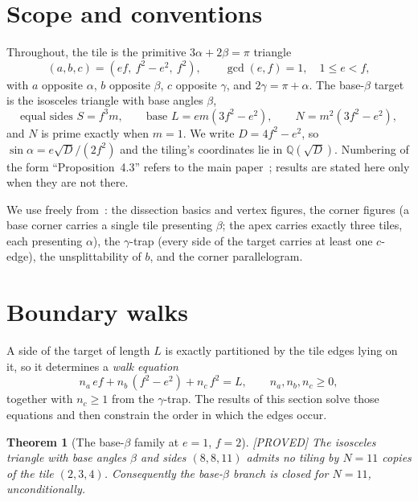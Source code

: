 \documentclass[11pt,reqno]{amsart}
\theoremstyle{plain}
\newtheorem{theorem}{Theorem}
\theoremstyle{definition}
\newcommand{\Q}{\mathbb{Q}}
\newcommand{\lab}[1]{\hfill\textnormal{\footnotesize\textsc{[#1]}}}
\begin{document}
\maketitle

\section{Scope and conventions}\label{sec:compscope}

Throughout, the tile is the primitive $3\alpha+2\beta=\pi$ triangle
\[
(a,b,c)=(ef,\ f^2-e^2,\ f^2),\qquad \gcd(e,f)=1,\quad 1\le e<f,
\]
with $a$ opposite $\alpha$, $b$ opposite $\beta$, $c$ opposite $\gamma$, and $2\gamma=\pi+\alpha$.
The base-$\beta$ target is the isosceles triangle with base angles $\beta$,
\[
\text{equal sides } S=f^3m,\qquad \text{base } L=em(3f^2-e^2),\qquad N=m^2(3f^2-e^2),
\]
and $N$ is prime exactly when $m=1$. We write $D=4f^2-e^2$, so $\sin\alpha=e\sqrt D/(2f^2)$ and the
tiling's coordinates lie in $\Q(\sqrt D)$. Numbering of the form ``Proposition~4.3'' refers to the
main paper~\cite{Main}; results are stated here only when they are not there.

We use freely from~\cite{Main}: the dissection basics and vertex figures, the corner figures (a
base corner carries a single tile presenting $\beta$; the apex carries exactly three tiles, each
presenting $\alpha$), the $\gamma$-trap (every side of the target carries at least one $c$-edge),
the unsplittability of $b$, and the corner parallelogram.

\section{Boundary walks}\label{sec:compwalks}

A side of the target of length $L$ is exactly partitioned by the tile edges lying on it, so it
determines a \emph{walk equation}
\[
n_a\,ef+n_b\,(f^2-e^2)+n_c\,f^2=L,\qquad n_a,n_b,n_c\ge0 ,
\]
together with $n_c\ge1$ from the $\gamma$-trap. The results of this section solve those equations
and then constrain the order in which the edges occur.

\begin{theorem}[The base-$\beta$ family at $e=1$, $f=2$]\label{thm:basebeta-e1}\lab{PROVED}
The isosceles triangle with base angles $\beta$ and sides $(8,8,11)$ admits no tiling by $N=11$
copies of the tile $(2,3,4)$. Consequently the base-$\beta$ branch is closed for $N=11$,
unconditionally.
\end{theorem}
\end{document}
